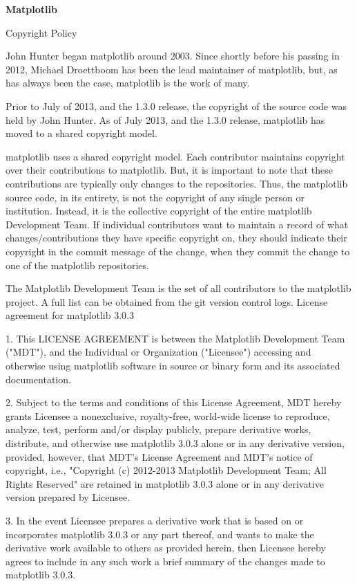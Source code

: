 \textbf{Matplotlib}

Copyright Policy

John Hunter began matplotlib around 2003. Since shortly before his passing in 2012, Michael Droettboom has been the lead maintainer of matplotlib, but, as has always been the case, matplotlib is the work of many.

Prior to July of 2013, and the 1.3.0 release, the copyright of the source code was held by John Hunter. As of July 2013, and the 1.3.0 release, matplotlib has moved to a shared copyright model.

matplotlib uses a shared copyright model. Each contributor maintains copyright over their contributions to matplotlib. But, it is important to note that these contributions are typically only changes to the repositories. Thus, the matplotlib source code, in its entirety, is not the copyright of any single person or institution. Instead, it is the collective copyright of the entire matplotlib Development Team. If individual contributors want to maintain a record of what changes/contributions they have specific copyright on, they should indicate their copyright in the commit message of the change, when they commit the change to one of the matplotlib repositories.

The Matplotlib Development Team is the set of all contributors to the matplotlib project. A full list can be obtained from the git version control logs.
License agreement for matplotlib 3.0.3

1. This LICENSE AGREEMENT is between the Matplotlib Development Team ("MDT"), and the Individual or Organization ("Licensee") accessing and otherwise using matplotlib software in source or binary form and its associated documentation.

2. Subject to the terms and conditions of this License Agreement, MDT hereby grants Licensee a nonexclusive, royalty-free, world-wide license to reproduce, analyze, test, perform and/or display publicly, prepare derivative works, distribute, and otherwise use matplotlib 3.0.3 alone or in any derivative version, provided, however, that MDT's License Agreement and MDT's notice of copyright, i.e., "Copyright (c) 2012-2013 Matplotlib Development Team; All Rights Reserved" are retained in matplotlib 3.0.3 alone or in any derivative version prepared by Licensee.

3. In the event Licensee prepares a derivative work that is based on or incorporates matplotlib 3.0.3 or any part thereof, and wants to make the derivative work available to others as provided herein, then Licensee hereby agrees to include in any such work a brief summary of the changes made to matplotlib 3.0.3.

